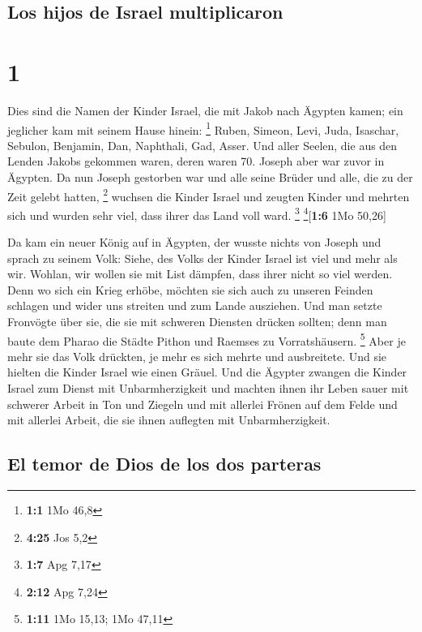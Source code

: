 \hypertarget{los-hijos-de-israel-multiplicaron}{%
\subsection{Los hijos de Israel
multiplicaron}\label{los-hijos-de-israel-multiplicaron}}

\hypertarget{section}{%
\section{1}\label{section}}

 Dies sind die Namen der Kinder Israel, die mit Jakob nach
Ägypten kamen; ein jeglicher kam mit seinem Hause hinein: \footnote{\textbf{1:1}
  1Mo 46,8}  Ruben, Simeon, Levi, Juda, 
Isaschar, Sebulon, Benjamin,  Dan, Naphthali, Gad, Asser.
 Und aller Seelen, die aus den Lenden Jakobs gekommen
waren, deren waren 70. Joseph aber war zuvor in Ägypten. 
Da nun Joseph gestorben war und alle seine Brüder und alle, die zu der
Zeit gelebt hatten, \footnote{\textbf{4:25} Jos 5,2} 
wuchsen die Kinder Israel und zeugten Kinder und mehrten sich und wurden
sehr viel, dass ihrer das Land voll ward. \footnote{\textbf{1:7} Apg
  7,17} \footnote{\textbf{2:12} Apg 7,24}{[}\textbf{1:6} 1Mo 50,26{]}

 Da kam ein neuer König auf in Ägypten, der wusste nichts
von Joseph  und sprach zu seinem Volk: Siehe, des Volks
der Kinder Israel ist viel und mehr als wir.  Wohlan, wir
wollen sie mit List dämpfen, dass ihrer nicht so viel werden. Denn wo
sich ein Krieg erhöbe, möchten sie sich auch zu unseren Feinden schlagen
und wider uns streiten und zum Lande ausziehen.  Und man
setzte Fronvögte über sie, die sie mit schweren Diensten drücken
sollten; denn man baute dem Pharao die Städte Pithon und Raemses zu
Vorratshäusern. \footnote{\textbf{1:11} 1Mo 15,13; 1Mo 47,11}
 Aber je mehr sie das Volk drückten, je mehr es sich
mehrte und ausbreitete. Und sie hielten die Kinder Israel wie einen
Gräuel.  Und die Ägypter zwangen die Kinder Israel zum
Dienst mit Unbarmherzigkeit  und machten ihnen ihr Leben
sauer mit schwerer Arbeit in Ton und Ziegeln und mit allerlei Frönen auf
dem Felde und mit allerlei Arbeit, die sie ihnen auflegten mit
Unbarmherzigkeit.

\hypertarget{el-temor-de-dios-de-los-dos-parteras}{%
\subsection{El temor de Dios de los dos
parteras}\label{el-temor-de-dios-de-los-dos-parteras}}

